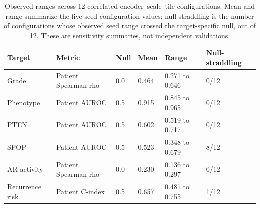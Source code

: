 \begin{table}[H]
\centering
\scriptsize
\caption{Observed ranges across 12 correlated encoder--scale--tile configurations. Mean and range summarize the five-seed configuration values; null-straddling is the number of configurations whose observed seed range crossed the target-specific null, out of 12. These are sensitivity summaries, not independent validations.}
\label{tab:supp-stability}
\begin{tabular}{@{}p{}p{}p{}p{}p{}p{}@{}}
\toprule
Target & Metric & Null & Mean & Range & Null-straddling \\
\midrule
Grade & Patient Spearman rho & 0.0 & 0.464 & 0.271 to 0.646 & 0/12 \\
Phenotype & Patient AUROC & 0.5 & 0.915 & 0.845 to 0.965 & 0/12 \\
PTEN & Patient AUROC & 0.5 & 0.602 & 0.519 to 0.717 & 0/12 \\
SPOP & Patient AUROC & 0.5 & 0.523 & 0.348 to 0.679 & 8/12 \\
AR activity & Patient Spearman rho & 0.0 & 0.230 & 0.136 to 0.297 & 0/12 \\
Recurrence risk & Patient C-index & 0.5 & 0.657 & 0.481 to 0.755 & 1/12 \\
\bottomrule
\end{tabular}
\end{table}
